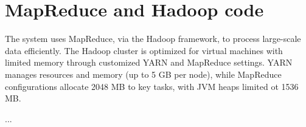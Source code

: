 \section{MapReduce and Hadoop code}
The system uses MapReduce, via the Hadoop framework, to process large-scale data efficiently. The Hadoop cluster is optimized for virtual machines with limited memory through customized YARN and MapReduce settings. YARN manages resources and memory (up to 5 GB per node), while MapReduce configurations allocate 2048 MB to key tasks, with JVM heaps limited ot 1536 MB. 

...

